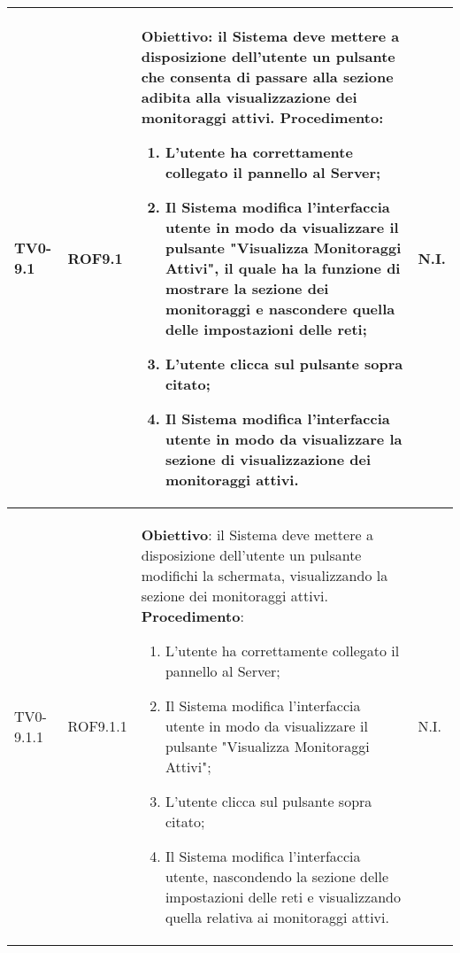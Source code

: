\begin{longtable}{|C{.15\textwidth}|C{.13\textwidth}|m{.65\textwidth}|C{.08\textwidth}|}
TV0-9.1 & ROF9.1 &
	\textbf{Obiettivo}: il Sistema deve mettere a disposizione dell'utente un pulsante che consenta di passare alla sezione adibita alla visualizzazione dei monitoraggi attivi. \newline
	\textbf{Procedimento}:
	\begin{enumerate}
		\item L'utente ha correttamente collegato il pannello al Server;
		\item Il Sistema modifica l'interfaccia utente in modo da visualizzare il pulsante "Visualizza Monitoraggi Attivi", il quale ha la funzione di mostrare la sezione dei monitoraggi e nascondere quella delle impostazioni delle reti;
		\item L'utente clicca sul pulsante sopra citato;
		\item Il Sistema modifica l'interfaccia utente in modo da visualizzare la sezione di visualizzazione dei monitoraggi attivi.
	\end{enumerate}
	& N.I. \\
\hline	

TV0-9.1.1 & ROF9.1.1 &
	\textbf{Obiettivo}: il Sistema deve mettere a disposizione dell'utente un pulsante modifichi la schermata, visualizzando la sezione dei monitoraggi attivi. \newline
	\textbf{Procedimento}:
	\begin{enumerate}
		\item L'utente ha correttamente collegato il pannello al Server;
		\item Il Sistema modifica l'interfaccia utente in modo da visualizzare il pulsante "Visualizza Monitoraggi Attivi";
		\item L'utente clicca sul pulsante sopra citato;
		\item Il Sistema modifica l'interfaccia utente, nascondendo la sezione delle impostazioni delle reti e visualizzando quella relativa ai monitoraggi attivi.
	\end{enumerate}
	& N.I. \\
\hline	


\end{longtable}
